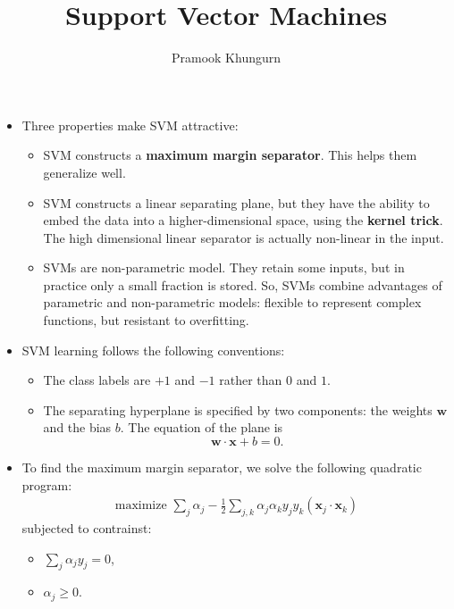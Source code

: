 \documentclass[10pt]{article}
\title{Support Vector Machines}
\author{Pramook Khungurn}
\newcommand{\ve}[1]{\mathbf{#1}}
\begin{document}
\maketitle

\begin{itemize}
    \item Three properties make SVM attractive:
        \begin{itemize}
            \item SVM constructs a {\bf maximum margin separator}.
                This helps them generalize well.
            \item SVM constructs a linear separating plane,
                but they have the ability to embed the data
                into a higher-dimensional space, using
                the {\bf kernel trick}. The high dimensional
                linear separator is actually non-linear in
                the input.
            \item SVMs are non-parametric model.
                They retain some inputs, but in practice
                only a small fraction is stored.
                So, SVMs combine advantages of parametric
                and non-parametric models: flexible to
                represent complex functions, but 
                resistant to overfitting.
        \end{itemize}
        
    \item SVM learning follows the following conventions:
        \begin{itemize}
            \item The class labels are $+1$ and $-1$ rather
                than $0$ and $1$.
            \item The separating hyperplane is specified by
                two components: the weights $\ve{w}$ and 
                the bias $b$. The equation of the plane is
                $$\ve{w}\cdot\ve{x} + b = 0.$$
        \end{itemize}
        
    \item To find the maximum margin separator, we solve
        the following quadratic program:
        \begin{align*}
            \mbox{maximize } \sum_j \alpha_j 
                - \frac{1}{2} \sum_{j,k} \alpha_j \alpha_k
                    y_j y_k (\ve{x}_j \cdot \ve{x}_k)
        \end{align*}
        subjected to contrainst:
        \begin{itemize}
            \item $\sum_j \alpha_j y_j = 0$,
            \item $\alpha_j \geq 0$.
        \end{itemize}
    

\end{itemize}
\end{document}
